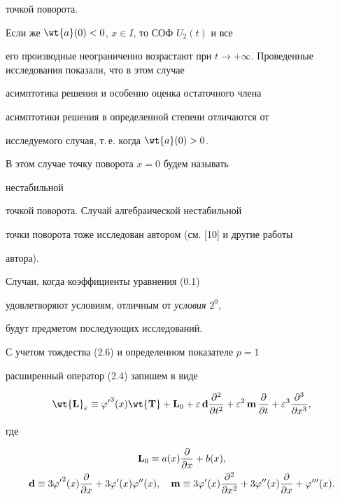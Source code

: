 точкой поворота.





Если же $\wt{a} (0) < 0$, $x \in I$, то СОФ $ U_2 (t)$ и все


его производные неограниченно возрастают при $t \rightarrow +


\infty$. Проведенные исследования показали, что в этом случае


асимптотика решения и особенно оценка остаточного члена


асимптотики решения в определенной степени отличаются от


исследуемого случая, т.\,е. когда $ \wt{a} (0)> 0$.


В этом случае точку поворота $x=0$ будем называть {\it


нестабильной} точкой поворота. Случай алгебраической нестабильной


точки поворота тоже исследован автором (см. [10] и другие работы


автора).





\begin{note}


Случаи, когда коэффициенты уравнения (0.1)


удовлетворяют условиям, отличным от {\it условия} $2^0$,


будут предметом последующих исследований.


\end{note}





С учетом тождества (2.6) и определенном показателе $p = 1$


расширенный оператор (2.4) запишем в виде


\begin{equation}


\wt{\bold{L}}_{\e} \equiv {\f'}^3 (x) \wt{\bold{T}} +


\bold{L}_0 + \e\, \bold{d} \frac{\d^2}{\d t^2 }


+ \e^2\, \bold{m}\, \frac{\d}{\d t} + \e^3 \frac{\d^3}{\d x^3},


\end{equation}


где


\begin{gather*}


\bold{L}_0 \equiv a(x) \frac{\d}{\d x} + b(x), \\


\bold{d} \equiv 3 {\f'}^2 (x) \frac{\d}{\d x}


+ 3 \f'(x) \f''(x), \quad \bold{m} \equiv 3 \f' (x)


\frac{\d^2}{\d x^2} + 3 \f''(x) \frac{\d}{\d x} + \f'''(x).


\end{gather*}





